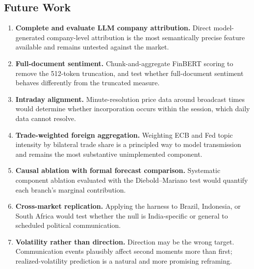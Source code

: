 \documentclass[11pt]{article}
\begin{document}
\subsection{Future Work}
\begin{enumerate}[leftmargin=*, itemsep=0pt, topsep=4pt]
    \item \textbf{Complete and evaluate LLM company attribution.} Direct model-generated company-level attribution is the most semantically precise feature available and remains untested against the market.
    \item \textbf{Full-document sentiment.} Chunk-and-aggregate FinBERT scoring to remove the 512-token truncation, and test whether full-document sentiment behaves differently from the truncated measure.
    \item \textbf{Intraday alignment.} Minute-resolution price data around broadcast times would determine whether incorporation occurs within the session, which daily data cannot resolve.
    \item \textbf{Trade-weighted foreign aggregation.} Weighting ECB and Fed topic intensity by bilateral trade share is a principled way to model transmission and remains the most substantive unimplemented component.
    \item \textbf{Causal ablation with formal forecast comparison.} Systematic component ablation evaluated with the Diebold--Mariano test \cite{diebold1995} would quantify each branch's marginal contribution.
    \item \textbf{Cross-market replication.} Applying the harness to Brazil, Indonesia, or South Africa would test whether the null is India-specific or general to scheduled political communication.
    \item \textbf{Volatility rather than direction.} Direction may be the wrong target. Communication events plausibly affect second moments more than first; realized-volatility prediction is a natural and more promising reframing.
\end{enumerate}
\end{document}
